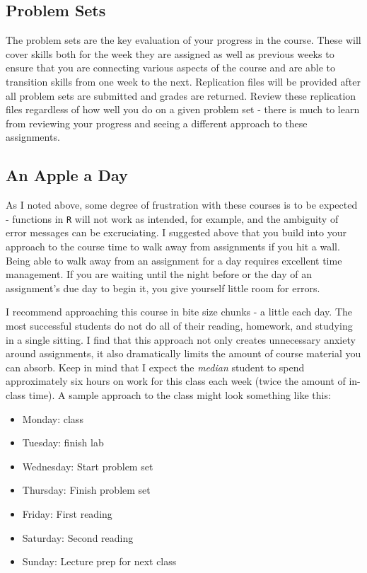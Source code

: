 \documentclass[]{book}
\providecommand{\tightlist}{%
  \setlength{\itemsep}{0pt}\setlength{\parskip}{0pt}}
\theoremstyle{definition}
\theoremstyle{definition}
\theoremstyle{definition}
\theoremstyle{remark}
\begin{document}
\subsection{Problem Sets}\label{problem-sets}

The problem sets are the key evaluation of your progress in the course.
These will cover skills both for the week they are assigned as well as
previous weeks to ensure that you are connecting various aspects of the
course and are able to transition skills from one week to the next.
Replication files will be provided after all problem sets are submitted
and grades are returned. Review these replication files regardless of
how well you do on a given problem set - there is much to learn from
reviewing your progress and seeing a different approach to these
assignments.

\subsection{An Apple a Day}\label{an-apple-a-day}

As I noted above, some degree of frustration with these courses is to be
expected - functions in \texttt{R} will not work as intended, for
example, and the ambiguity of error messages can be excruciating. I
suggested above that you build into your approach to the course time to
walk away from assignments if you hit a wall. Being able to walk away
from an assignment for a day requires excellent time management. If you
are waiting until the night before or the day of an assignment's due day
to begin it, you give yourself little room for errors.

I recommend approaching this course in bite size chunks - a little each
day. The most successful students do not do all of their reading,
homework, and studying in a single sitting. I find that this approach
not only creates unnecessary anxiety around assignments, it also
dramatically limits the amount of course material you can absorb. Keep
in mind that I expect the \emph{median} student to spend approximately
six hours on work for this class each week (twice the amount of in-class
time). A sample approach to the class might look something like this:

\begin{itemize}
\tightlist
\item
  Monday: class
\item
  Tuesday: finish lab
\item
  Wednesday: Start problem set
\item
  Thursday: Finish problem set
\item
  Friday: First reading
\item
  Saturday: Second reading
\item
  Sunday: Lecture prep for next class
\end{itemize}
\end{document}
